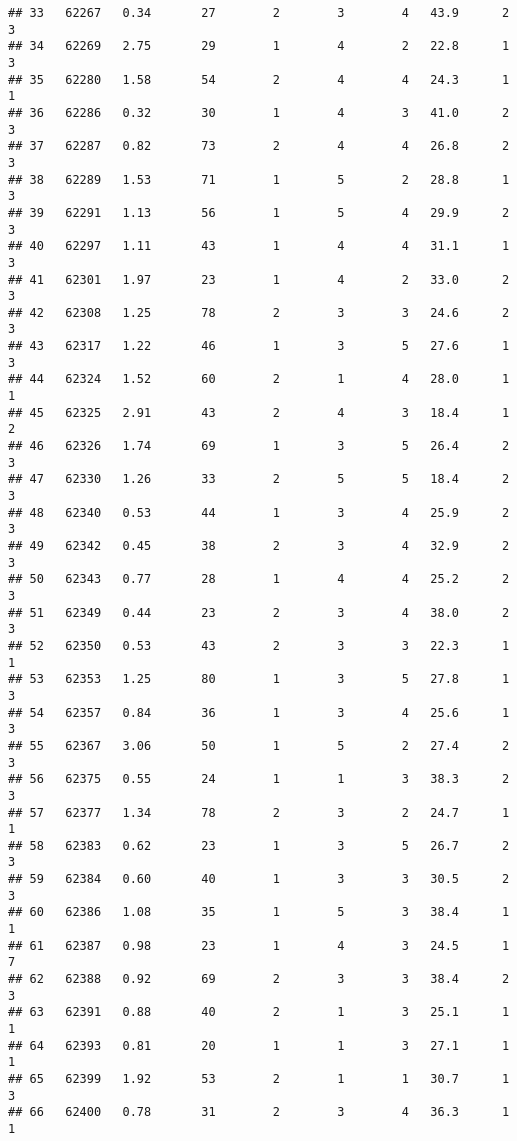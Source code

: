 \documentclass[
]{article}
\begin{document}
\begin{verbatim}
## 33   62267   0.34       27        2        3        4   43.9      2      3
## 34   62269   2.75       29        1        4        2   22.8      1      3
## 35   62280   1.58       54        2        4        4   24.3      1      1
## 36   62286   0.32       30        1        4        3   41.0      2      3
## 37   62287   0.82       73        2        4        4   26.8      2      3
## 38   62289   1.53       71        1        5        2   28.8      1      3
## 39   62291   1.13       56        1        5        4   29.9      2      3
## 40   62297   1.11       43        1        4        4   31.1      1      3
## 41   62301   1.97       23        1        4        2   33.0      2      3
## 42   62308   1.25       78        2        3        3   24.6      2      3
## 43   62317   1.22       46        1        3        5   27.6      1      3
## 44   62324   1.52       60        2        1        4   28.0      1      1
## 45   62325   2.91       43        2        4        3   18.4      1      2
## 46   62326   1.74       69        1        3        5   26.4      2      3
## 47   62330   1.26       33        2        5        5   18.4      2      3
## 48   62340   0.53       44        1        3        4   25.9      2      3
## 49   62342   0.45       38        2        3        4   32.9      2      3
## 50   62343   0.77       28        1        4        4   25.2      2      3
## 51   62349   0.44       23        2        3        4   38.0      2      3
## 52   62350   0.53       43        2        3        3   22.3      1      1
## 53   62353   1.25       80        1        3        5   27.8      1      3
## 54   62357   0.84       36        1        3        4   25.6      1      3
## 55   62367   3.06       50        1        5        2   27.4      2      3
## 56   62375   0.55       24        1        1        3   38.3      2      3
## 57   62377   1.34       78        2        3        2   24.7      1      1
## 58   62383   0.62       23        1        3        5   26.7      2      3
## 59   62384   0.60       40        1        3        3   30.5      2      3
## 60   62386   1.08       35        1        5        3   38.4      1      1
## 61   62387   0.98       23        1        4        3   24.5      1      7
## 62   62388   0.92       69        2        3        3   38.4      2      3
## 63   62391   0.88       40        2        1        3   25.1      1      1
## 64   62393   0.81       20        1        1        3   27.1      1      1
## 65   62399   1.92       53        2        1        1   30.7      1      3
## 66   62400   0.78       31        2        3        4   36.3      1      1

\end{verbatim}
\end{document}
